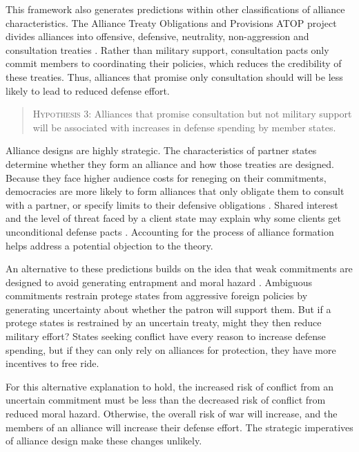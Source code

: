 \documentclass[12pt]{article}
\begin{document}
This framework also generates predictions within other classifications of alliance characteristics. The Alliance Treaty Obligations and Provisions ATOP project divides alliances into offensive, defensive, neutrality, non-aggression and consultation treaties \citet{Leedsetal2002}. Rather than military support, consultation pacts only commit members to coordinating their policies, which reduces the credibility of these treaties. Thus, alliances that promise only consultation should will be less likely to lead to reduced defense effort. 

\begin{quote}
\textsc{Hypothesis 3}: Alliances that promise consultation but not military support will be associated with increases in defense spending by member states. 
\end{quote}

Alliance designs are highly strategic. The characteristics of partner states determine whether they form an alliance and how those treaties are designed. Because they face higher audience costs for reneging on their commitments, democracies are more likely to form alliances that only obligate them to consult with a partner, or specify limits to their defensive obligations \citep{Chibaetal2015}. Shared interest and the level of threat faced by a client state may explain why some clients get unconditional defense pacts \citep{Yarhi-Miloetal2016}. Accounting for the process of alliance formation helps address a potential objection to the theory.

An alternative to these predictions builds on the idea that weak commitments are designed to avoid generating entrapment and moral hazard \citep{Benson2012}. Ambiguous commitments restrain protege states from aggressive foreign policies by generating uncertainty about whether the patron will support them. But if a protege states is restrained by an uncertain treaty, might they then reduce military effort? States seeking conflict have every reason to increase defense spending, but if they can only rely on alliances for protection, they have more incentives to free ride. 

For this alternative explanation to hold, the increased risk of conflict from an uncertain commitment must be less than the decreased risk of conflict from reduced moral hazard. Otherwise, the overall risk of war will increase, and the members of an alliance will increase their defense effort. The strategic imperatives of alliance design make these changes unlikely. 
\end{document}
